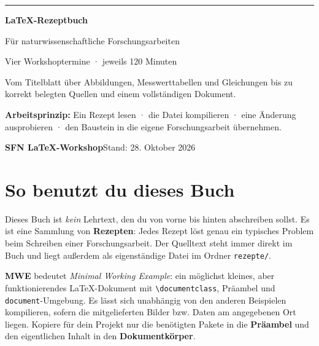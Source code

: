 \documentclass[11pt,a4paper,parskip=half]{scrartcl} %
\begin{document}
\begin{titlepage}
  \thispagestyle{empty}
  \vspace*{2cm}
  {\color{SFNteal}\rule{3.5cm}{2.2pt}}\par\vspace{1cm}
  {\Huge\bfseries\color{SFNnavy}LaTeX-Rezeptbuch\par}
  \vspace{.35cm}
  {\LARGE Für naturwissenschaftliche Forschungsarbeiten\par}
  \vspace{1.5cm}
  {\Large Vier Workshoptermine · jeweils 120 Minuten\par}
  \vspace{1cm}
  Vom Titelblatt über Abbildungen, Messwerttabellen und Gleichungen
  bis zu korrekt belegten Quellen und einem vollständigen Dokument.
  \vfill
  \begin{tcolorbox}[colback=SFNlight,colframe=SFNteal,boxrule=.5pt,arc=2mm]
  \textbf{Arbeitsprinzip:} Ein Rezept lesen · die Datei kompilieren · eine
  Änderung ausprobieren · den Baustein in die eigene Forschungsarbeit übernehmen.
  \end{tcolorbox}
  \vspace{1.4cm}
  \textbf{SFN LaTeX-Workshop}\hfill Stand: 28. Oktober 2026
\end{titlepage}

\tableofcontents


\clearpage

\section{So benutzt du dieses Buch}
Dieses Buch ist \emph{kein} Lehrtext, den du von vorne bis hinten abschreiben sollst.
Es ist eine Sammlung von \textbf{Rezepten}: Jedes Rezept löst genau ein typisches
Problem beim Schreiben einer Forschungsarbeit. Der Quelltext steht immer direkt
im Buch und liegt außerdem als eigenständige Datei im Ordner \texttt{rezepte/}.

\begin{merkbox}
\textbf{MWE} bedeutet \emph{Minimal Working Example}: ein möglichst kleines,
aber funktionierendes LaTeX-Dokument mit \texttt{\textbackslash documentclass},
Präambel und \texttt{document}-Umgebung. Es lässt sich unabhängig von den anderen
Beispielen kompilieren, sofern die mitgelieferten Bilder bzw. Daten am angegebenen
Ort liegen. Kopiere für dein Projekt nur die benötigten Pakete in die
\textbf{Präambel} und den eigentlichen Inhalt in den \textbf{Dokumentkörper}.
\end{merkbox}
\end{document}
